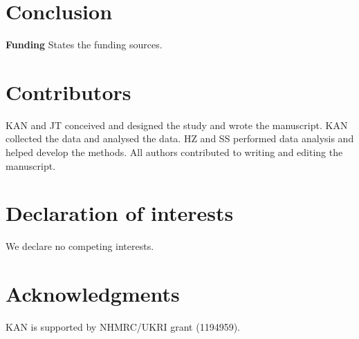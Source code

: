 \documentclass[preprint,12pt]{elsarticle}
\begin{document}
\section*{Conclusion}

\textbf{Funding} States the funding sources.







\section*{Contributors}\label{sec:credit}
KAN and JT conceived and designed the study and wrote the manuscript. KAN collected the data and analysed the data. HZ and SS performed data analysis and helped develop the methods. All authors contributed to writing and editing the manuscript.

\section*{Declaration of interests}\label{sec:dec}
We declare no competing interests.

\section*{Acknowledgments}\label{sec:ak}
KAN is supported by NHMRC/UKRI grant (1194959).
\end{document}
